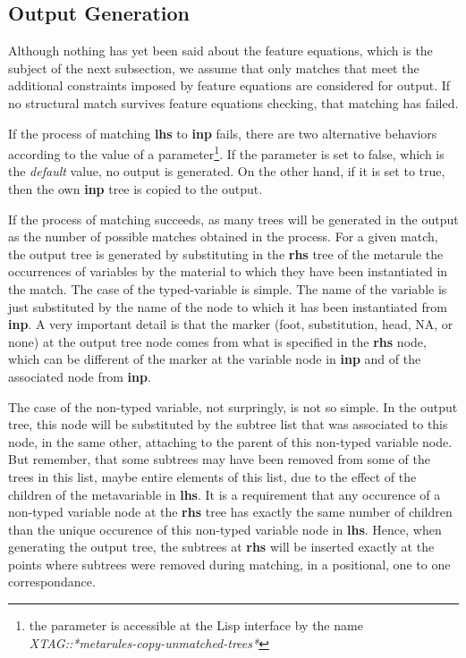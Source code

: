 \subsection{Output Generation}
\label{output-gen}

Although nothing has yet been said about the feature
equations, which is the subject of the next subsection, we assume that only
matches that meet the additional constraints imposed by feature equations
are considered for output. If no structural match survives feature equations
checking, that matching has failed.

If the process of matching {\bf lhs} to {\bf inp} fails, there are two 
alternative behaviors according to the value of a parameter\footnote{the
parameter is accessible at the Lisp interface by the name 
{\it XTAG::*metarules-copy-unmatched-trees*}}. 
If the parameter is set to false, which is the {\it default} value, 
no output is generated. 
On the other hand, if 
it is set to true, then the own {\bf inp} tree is copied to the output.

If the process of matching succeeds, as many trees will be generated in the
output as the number of possible matches obtained in the process. For a 
given match, the output tree is generated by substituting in the {\bf rhs} tree
of the metarule the occurrences of variables by the material to which they have
been instantiated in the match. The case of the typed-variable is simple. 
The name of the variable is just substituted by the name of the node to which
it has been instantiated from {\bf inp}. A very important detail is that the
marker (foot, substitution, head, NA, or none) at the output tree node comes 
from what is specified in the {\bf rhs} node, which can be different of the
marker at the variable node in {\bf inp} and of the associated node from 
{\bf inp}.

The case of the non-typed variable, not surpringly, is not so simple. 
In the output tree, this node
will be substituted by the subtree list that was associated to this node,
in the same other, attaching to the parent of this non-typed variable node.
But remember, that some subtrees may have been removed from some of the trees
in this list, maybe entire elements of this list, due to the effect of the
children of the metavariable in {\bf lhs}. 
It is a 
requirement that any occurence of a non-typed variable node at the {\bf rhs}
tree has exactly the same number of children than the unique occurence of
this non-typed variable node in {\bf lhs}. Hence, when generating the output
tree, the subtrees at {\bf rhs}
will be inserted exactly at the points where subtrees were removed during 
matching, in a positional, one to one correspondance.

